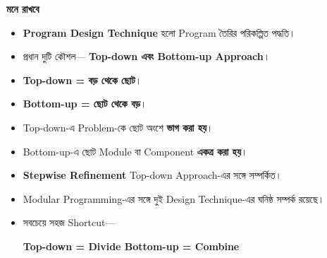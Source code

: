 
\begin{center}

\qquad
{}

\end{center}

\begin{rememberbox}

\textbf{\color{deepOrange}মনে রাখবে}

\begin{itemize}

\item \textbf{Program Design Technique} হলো Program তৈরির
পরিকল্পিত পদ্ধতি।

\item প্রধান দুটি কৌশল—
\textbf{Top-down এবং Bottom-up Approach}।

\item \textbf{Top-down = বড় থেকে ছোট}।

\item \textbf{Bottom-up = ছোট থেকে বড়}।

\item Top-down-এ Problem-কে ছোট অংশে
\textbf{ভাগ করা হয়}।

\item Bottom-up-এ ছোট Module বা Component
\textbf{একত্র করা হয়}।

\item \textbf{Stepwise Refinement} Top-down Approach-এর
সঙ্গে সম্পর্কিত।

\item Modular Programming-এর সঙ্গে দুই Design Technique-এর
ঘনিষ্ঠ সম্পর্ক রয়েছে।

\item সবচেয়ে সহজ Shortcut—

\begin{center}

\textbf{
Top-down = Divide
\qquad\qquad
Bottom-up = Combine
}

\end{center}

\end{itemize}

\end{rememberbox}

\small

